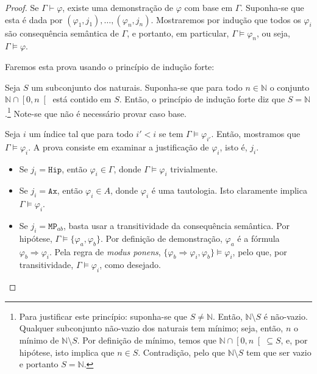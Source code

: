 \documentclass{report}
\theoremstyle{definition}
\theoremstyle{remark}
\newcommand{\N}{\mathbb{N}}
\newcommand{\imply}{\mathbin{\Rightarrow}}
\begin{document}
	\begin{proof}
	Se $\Gamma \vdash \varphi$, existe uma demonstração de $\varphi$ com base em $\Gamma$. Suponha-se que esta é dada por $(\varphi_1, j_1), \dots, (\varphi_n, j_n)$. Mostraremos por indução que todos os $\varphi_i$ são consequência semântica de $\Gamma$, e portanto, em particular, $\Gamma \vDash \varphi_n$, ou seja, $\Gamma \vDash \varphi$.
	
	Faremos esta prova usando o princípio de indução forte:
	
	\begin{center}
	Seja $S$ um subconjunto dos naturais. Suponha-se que para todo $n \in \N$ o conjunto $\N \cap \left[0,n\right[$ está contido em $S$. Então, o princípio de indução forte diz que $S = \N$.\footnote{Para justificar este princípio: suponha-se que $S \neq \N$. Então, $\N \setminus S$ é não-vazio. Qualquer subconjunto não-vazio dos naturais tem mínimo; seja, então, $n$ o mínimo de $\N \setminus S$. Por definição de mínimo, temos que $\N \cap \left[0, n\right[ \subseteq S$, e, por hipótese, isto implica que $n \in S$. Contradição, pelo que $\N \setminus S$ tem que ser vazio e portanto $S = \N$.} Note-se que não é necessário provar caso base.
	\end{center}
	
	Seja $i$ um índice tal que para todo $i' < i$ se tem $\Gamma \vDash \varphi_{i'}$. Então, mostramos que $\Gamma \vDash \varphi_i$. A prova consiste em examinar a justificação de $\varphi_i$, isto é, $j_i$.
	
	\begin{itemize}
	\item Se $j_i = \texttt{Hip}$, então $\varphi_i \in \Gamma$, donde $\Gamma \vDash \varphi_i$ trivialmente.
	
	\item Se $j_i = \texttt{Ax}$, então $\varphi_i \in A$, donde $\varphi_i$ é uma tautologia. Isto claramente implica $\Gamma\vDash\varphi_i$.
	
	\item Se $j_i = \texttt{MP}_{ab}$, basta usar a transitividade da consequência semântica. Por hipótese, $\Gamma \vDash \{\varphi_a, \varphi_b\}$. Por definição de demonstração, $\varphi_a$ é a fórmula $\varphi_b \imply \varphi_i$. Pela regra de \textit{modus ponens}, $\{\varphi_b \imply \varphi_i, \varphi_b\} \vDash \varphi_i$, pelo que, por transitividade, $\Gamma \vDash \varphi_i$, como desejado.
	\end{itemize}
	\end{proof}
	
\end{document}
